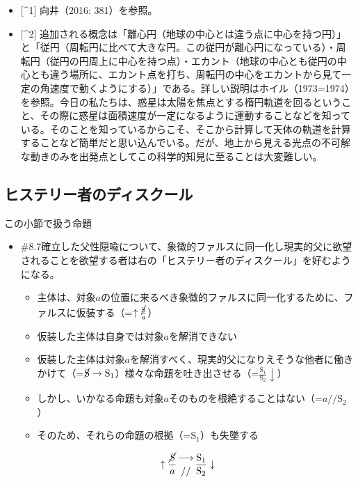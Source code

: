 \begin{itemize}
\tightlist
\item
  {[}\^{}1{]} 向井（2016: 381）を参照。
\item
  {[}\^{}2{]}
  追加される概念は「離心円（地球の中心とは違う点に中心を持つ円）」と「従円（周転円に比べて大きな円。この従円が離心円になっている）・周転円（従円の円周上に中心を持つ点）・エカント（地球の中心とも従円の中心とも違う場所に、エカント点を打ち、周転円の中心をエカントから見て一定の角速度で動くようにする）」である。詳しい説明はホイル（1973=1974）を参照。今日の私たちは、惑星は太陽を焦点とする楕円軌道を回るということ、その際に惑星は面積速度が一定になるように運動することなどを知っている。そのことを知っているからこそ、そこから計算して天体の軌道を計算することなど簡単だと思い込んでいる。だが、地上から見える光点の不可解な動きのみを出発点としてこの科学的知見に至ることは大変難しい。
\end{itemize}

\subsection{ヒステリー者のディスクール}\label{ux30d2ux30b9ux30c6ux30eaux30fcux8005ux306eux30c7ux30a3ux30b9ux30afux30fcux30eb}

\begin{note}{この小節で扱う命題}
  \begin{itemize}
    \tightlist
    \item{\#8.7}確立した父性隠喩について、象徴的ファルスに同一化し現実的父に欲望されることを欲望する者は右の「ヒステリー者のディスクール」を好むようになる。
      \begin{itemize}
        \tightlist
        \item 主体は、対象$a$の位置に来るべき象徴的ファルスに同一化するために、ファルスに仮装する（=$\uparrow\frac{\cancel{\textrm{S}}}{a}$）
        \item 仮装した主体は自身では対象$a$を解消できない
        \item 仮装した主体は対象$a$を解消すべく、現実的父になりえそうな他者に働きかけて（=$\cancel{\textrm{S}}\rightarrow\textrm{S}_1$）様々な命題を吐き出させる（=$\frac{\textrm{S}_1}{\textrm{S}_2}\downarrow$）
        \item しかし、いかなる命題も対象$a$そのものを根絶することはない（=$a//\textrm{S}_2$）
        \item そのため、それらの命題の根拠（=$\textrm{S}_1$）も失墜する
      \end{itemize}

$$
\uparrow\frac{\mathrm{\cancel{S}}}{a}\genfrac{}{}{0pt}{}{\longrightarrow}{//}\frac{\mathrm{S_1}}{\mathrm{S_2}}\downarrow
$$
  \end{itemize}
\end{note}

